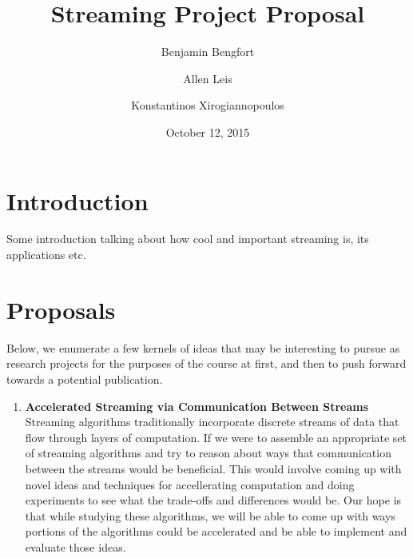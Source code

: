 \documentclass[11pt,letterpaper]{article}
\begin{document}
\title{Streaming Project Proposal}
\author[1]{Benjamin Bengfort}
\author[2]{Allen Leis}
\author[1]{Konstantinos Xirogiannopoulos}

\date{October 12, 2015}

\maketitle
\section{Introduction}
Some introduction talking about how cool and important streaming is, its applications etc.

\section{Proposals}
Below, we enumerate a few kernels of ideas that may be interesting to pursue as research projects for the purposes of the course at first, and then to push forward towards a potential publication.

\begin{enumerate}
  \item \textbf{Accelerated Streaming via Communication Between Streams}
   Streaming algorithms traditionally incorporate discrete streams of data that flow through layers of computation. If we were to assemble an appropriate set of streaming algorithms and try to reason about ways that communication between the streams would be beneficial. This would involve coming up with novel ideas and techniques for accellerating computation and doing experiments to see what the trade-offs and differences would be. Our hope is that while studying these algorithms, we will be able to come up with ways portions of the algorithms could be accelerated and be able to implement and evaluate those ideas. 
\end{enumerate}



\end{document}
